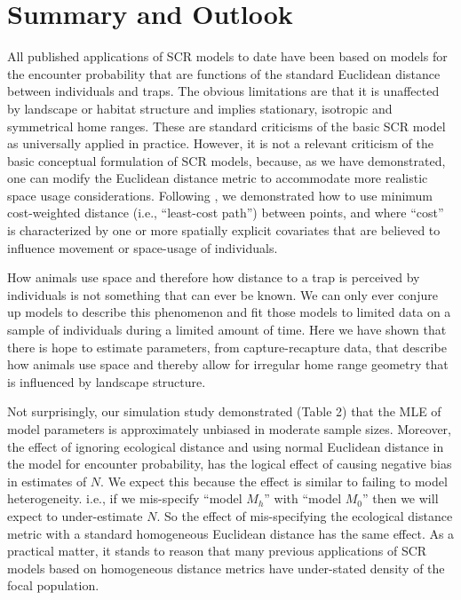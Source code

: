 \section{Summary and Outlook}


All published applications of SCR models to date have been based on models for the
encounter probability that are functions of the standard Euclidean
distance between individuals and traps. The obvious limitations are
that it is unaffected by landscape or habitat structure and implies
stationary, isotropic and symmetrical home ranges. These are standard
criticisms of the basic SCR model as universally applied in
practice. However, it is not a relevant criticism of the basic
conceptual formulation of SCR models, because, as we have
demonstrated, one can modify the Euclidean distance metric to
accommodate more realistic space usage considerations.  Following
\citet{royle_etal:2012ecol},
we demonstrated how to use
minimum cost-weighted distance (i.e., ``least-cost
path'') between points, and where ``cost'' is characterized by one or
more spatially explicit covariates that are believed to influence
movement or space-usage of individuals.

How animals use space and therefore how distance to a trap is
perceived by individuals is not something that can ever be known. We
can only ever conjure up models to describe this phenomenon and fit
those models to limited data on a sample of individuals during a
limited amount of time.  Here we have shown that there is hope to
estimate parameters, from capture-recapture data, that describe how
animals use space and thereby allow for irregular home range geometry
that is influenced by landscape structure.

Not surprisingly, our simulation study demonstrated
(Table 2) that the MLE of model parameters is
approximately unbiased in moderate sample sizes. Moreover, the effect
of ignoring ecological distance and using normal Euclidean distance in
the model for encounter probability, has the logical effect of causing
negative bias in estimates of $N$.  We expect this because the effect
is similar to failing to model heterogeneity. i.e., if we mis-specify
``model $M_h$'' \citep{otis_etal:1978} with ``model $M_0$''
\citep{otis_etal:1978} then we will expect to under-estimate $N$. So
the effect of mis-specifying the ecological distance metric with a
standard homogeneous Euclidean distance has the same effect. As a
practical matter, it stands to reason that many previous applications
of SCR models based on homogeneous distance metrics have under-stated
density of the focal population.

